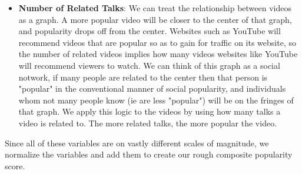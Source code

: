 \begin{itemize}
	\item \textbf{Number of Related Talks}: We can treat the relationship between videos as a graph. A more popular video will be closer to the center of that graph, and popularity drops off from the center. Websites such as YouTube will recommend videos that are popular so as to gain for traffic on its website, so the number of related videos implies how many videos websites like YouTube will recommend viewers to watch. We can think of this graph as a social notwork, if many people are related to the center then that person is "popular" in the conventional manner of social popularity, and individuals whom not many people know (ie are less "popular") will be on the fringes of that graph. We apply this logic to the videos by using how many talks a video is related to. The more related talks, the more popular the video.
\end{itemize}
Since all of these variables are on vastly different scales of magnitude, we normalize the variables and add them to create our rough composite popularity score. 

